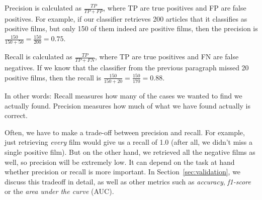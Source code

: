 Precision is calculated as $\frac{TP}{TP+FP}$, where TP are true
positives and FP are false positives. For example, if our classifier
retrieves 200 articles that it classifies as positive films, but only
150 of them indeed are positive films, then the precision is
$\frac{150}{150+50} = \frac{150}{200} = 0.75$.

Recall is calculated as $\frac{TP}{TP+FN}$, where TP are true
positives and FN are false negatives. If we know that the classifier
from the previous paragraph missed 20 positive films, then the recall
is $\frac{150}{150+20} = \frac{150}{170}= 0.88$.

In other words: Recall measures how many of the cases we wanted to
find we actually found. Precision measures how much of what we have
found actually is correct.

Often, we have to make a trade-off between precision and recall. For
example, just retrieving \emph{every} film would give us a recall of
1.0 (after all, we didn't miss a single positive film). But on the
other hand, we retrieved all the negative films as well, so precision
will be extremely low. It can depend on the task at hand whether
precision or recall is more important. In
Section~\ref{sec:validation}, we discuss this tradeoff in detail, as well as other metrics such as \emph{accuracy}, \emph{f1-score} or the \emph{area under the curve} (AUC).
